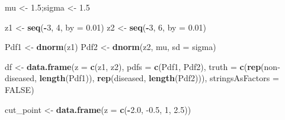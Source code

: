 \documentclass[
]{book}
\newenvironment{Shaded}{\begin{snugshade}}{\end{snugshade}}
\newcommand{\DataTypeTok}[1]{\textcolor[rgb]{0.13,0.29,0.53}{#1}}
\newcommand{\DecValTok}[1]{\textcolor[rgb]{0.00,0.00,0.81}{#1}}
\newcommand{\FloatTok}[1]{\textcolor[rgb]{0.00,0.00,0.81}{#1}}
\newcommand{\KeywordTok}[1]{\textcolor[rgb]{0.13,0.29,0.53}{\textbf{#1}}}
\newcommand{\NormalTok}[1]{#1}
\newcommand{\OperatorTok}[1]{\textcolor[rgb]{0.81,0.36,0.00}{\textbf{#1}}}
\newcommand{\OtherTok}[1]{\textcolor[rgb]{0.56,0.35,0.01}{#1}}
\newcommand{\StringTok}[1]{\textcolor[rgb]{0.31,0.60,0.02}{#1}}
\begin{document}
\begin{Shaded}
\begin{Highlighting}[]
\NormalTok{mu \textless{}{-}}\StringTok{ }\FloatTok{1.5}\NormalTok{;sigma \textless{}{-}}\StringTok{ }\FloatTok{1.5}

\NormalTok{z1 \textless{}{-}}\StringTok{ }\KeywordTok{seq}\NormalTok{(}\OperatorTok{{-}}\DecValTok{3}\NormalTok{, }\DecValTok{4}\NormalTok{, }\DataTypeTok{by =} \FloatTok{0.01}\NormalTok{)}
\NormalTok{z2 \textless{}{-}}\StringTok{ }\KeywordTok{seq}\NormalTok{(}\OperatorTok{{-}}\DecValTok{3}\NormalTok{, }\DecValTok{6}\NormalTok{, }\DataTypeTok{by =} \FloatTok{0.01}\NormalTok{)}

\NormalTok{Pdf1 \textless{}{-}}\StringTok{ }\KeywordTok{dnorm}\NormalTok{(z1)}
\NormalTok{Pdf2 \textless{}{-}}\StringTok{ }\KeywordTok{dnorm}\NormalTok{(z2, mu, }\DataTypeTok{sd =}\NormalTok{ sigma)}

\NormalTok{df \textless{}{-}}\StringTok{ }\KeywordTok{data.frame}\NormalTok{(}\DataTypeTok{z =} \KeywordTok{c}\NormalTok{(z1, z2), }\DataTypeTok{pdfs =} \KeywordTok{c}\NormalTok{(Pdf1, Pdf2), }
                 \DataTypeTok{truth =} 
                   \KeywordTok{c}\NormalTok{(}\KeywordTok{rep}\NormalTok{(}\StringTok{\textquotesingle{}non{-}diseased\textquotesingle{}}\NormalTok{, }
                         \KeywordTok{length}\NormalTok{(Pdf1)), }
                     \KeywordTok{rep}\NormalTok{(}\StringTok{\textquotesingle{}diseased\textquotesingle{}}\NormalTok{, }\KeywordTok{length}\NormalTok{(Pdf2))), }
                 \DataTypeTok{stringsAsFactors =} \OtherTok{FALSE}\NormalTok{)}

\NormalTok{cut\_point \textless{}{-}}\StringTok{ }\KeywordTok{data.frame}\NormalTok{(}\DataTypeTok{z =} \KeywordTok{c}\NormalTok{(}\OperatorTok{{-}}\FloatTok{2.0}\NormalTok{, }\FloatTok{{-}0.5}\NormalTok{, }\DecValTok{1}\NormalTok{, }\FloatTok{2.5}\NormalTok{))}


\end{Highlighting}
\end{Shaded}
\end{document}

